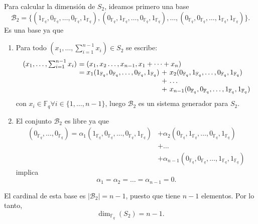 \begin{enumerate}[label=\alph*)]
	Para calcular la dimensión de $S_2$, ideamos primero una base
	\[\mathcal{B}_2 = \{(1_{\mathbb{F}_q},0_{\mathbb{F}_q},\dots,0_{\mathbb{F}_q},1_{\mathbb{F}_q}), (0_{\mathbb{F}_q},1_{\mathbb{F}_q},\dots,0_{\mathbb{F}_q},1_{\mathbb{F}_q}),\dots,(0_{\mathbb{F}_q},0_{\mathbb{F}_q},\dots,1_{\mathbb{F}_q},1_{\mathbb{F}_q})\}.\]
	Es una base ya que
	\begin{enumerate}[label=\arabic*)]
		\item Para todo $(x_1,\dots,\sum_{i=1}^{n-1}x_i)\in S_2$ se escribe:
		\[
			\begin{array}{r@{\ }l@{\ }l@{\ }l}
				(x_1,\dots,\sum_{i=1}^{n-1}x_i)&= \mathrlap{(x_1,x_2\dots,x_{n-1},x_1+\dots+x_n)}\\
				&= x_1(1_{\mathbb{F}_q},0_{\mathbb{F}_q},\dots,0_{\mathbb{F}_q},1_{\mathbb{F}_q}) &+& x_2(0_{\mathbb{F}_q},1_{\mathbb{F}_q},\dots,0_{\mathbb{F}_q},1_{\mathbb{F}_q})\\
				&	&+& \dots\\
				&	&+& x_{n-1}(0_{\mathbb{F}_q},0_{\mathbb{F}_q},\dots,1_{\mathbb{F}_q},1_{\mathbb{F}_q})
			\end{array}
		\]
		con $x_i\in\mathbb{F}_q\forall i\in\{1,\dots,n-1\}$, luego $\mathcal{B}_2$ es un sistema generador para $S_2$.
		
		\item El conjunto $\mathcal{B}_2$ es libre ya que
		\begin{align*}
			(0_{\mathbb{F}_q},\dots,0_{\mathbb{F}_q}) = \alpha_1(1_{\mathbb{F}_q},0_{\mathbb{F}_q},\dots,0_{\mathbb{F}_q},1_{\mathbb{F}_q}) &+ \alpha_2(0_{\mathbb{F}_q},1_{\mathbb{F}_q},\dots,0_{\mathbb{F}_q},1_{\mathbb{F}_q})\\
			&+ \dots\\
			&+ \alpha_{n-1}(0_{\mathbb{F}_q},0_{\mathbb{F}_q},\dots,1_{\mathbb{F}_q},1_{\mathbb{F}_q})
		\end{align*}
		implica
		\[\alpha_1=\alpha_2=\dots=\alpha_{n-1}=0.\]
	\end{enumerate}
	El cardinal de esta base es $|\mathcal{B}_2| = n-1$, puesto que tiene $n-1$ elementos. Por lo tanto,
	\[\dim_{\mathbb{F}_q}(S_2) = n-1.\]
\end{enumerate}
